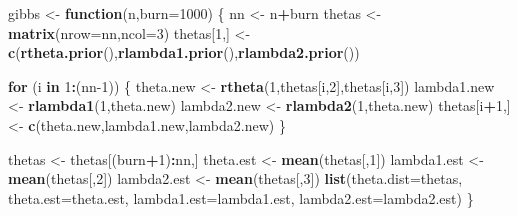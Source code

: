 \documentclass[
  11pt,
]{article}
\newenvironment{Shaded}{\begin{snugshade}}{\end{snugshade}}
\newcommand{\AttributeTok}[1]{\textcolor[rgb]{0.13,0.29,0.53}{#1}}
\newcommand{\ControlFlowTok}[1]{\textcolor[rgb]{0.13,0.29,0.53}{\textbf{#1}}}
\newcommand{\DecValTok}[1]{\textcolor[rgb]{0.00,0.00,0.81}{#1}}
\newcommand{\FunctionTok}[1]{\textcolor[rgb]{0.13,0.29,0.53}{\textbf{#1}}}
\newcommand{\NormalTok}[1]{#1}
\newcommand{\OtherTok}[1]{\textcolor[rgb]{0.56,0.35,0.01}{#1}}
\newcommand{\SpecialCharTok}[1]{\textcolor[rgb]{0.81,0.36,0.00}{\textbf{#1}}}
\begin{document}
\begin{Shaded}
\begin{Highlighting}[]
\NormalTok{gibbs }\OtherTok{\textless{}{-}} \ControlFlowTok{function}\NormalTok{(n,}\AttributeTok{burn=}\DecValTok{1000}\NormalTok{)}
\NormalTok{\{}
\NormalTok{  nn }\OtherTok{\textless{}{-}}\NormalTok{ n}\SpecialCharTok{+}\NormalTok{burn}
\NormalTok{  thetas }\OtherTok{\textless{}{-}} \FunctionTok{matrix}\NormalTok{(}\AttributeTok{nrow=}\NormalTok{nn,}\AttributeTok{ncol=}\DecValTok{3}\NormalTok{)}
\NormalTok{  thetas[}\DecValTok{1}\NormalTok{,] }\OtherTok{\textless{}{-}} \FunctionTok{c}\NormalTok{(}\FunctionTok{rtheta.prior}\NormalTok{(),}\FunctionTok{rlambda1.prior}\NormalTok{(),}\FunctionTok{rlambda2.prior}\NormalTok{())}
  
  \ControlFlowTok{for}\NormalTok{ (i }\ControlFlowTok{in} \DecValTok{1}\SpecialCharTok{:}\NormalTok{(nn}\DecValTok{{-}1}\NormalTok{))}
\NormalTok{  \{}
\NormalTok{    theta.new }\OtherTok{\textless{}{-}} \FunctionTok{rtheta}\NormalTok{(}\DecValTok{1}\NormalTok{,thetas[i,}\DecValTok{2}\NormalTok{],thetas[i,}\DecValTok{3}\NormalTok{])}
\NormalTok{    lambda1.new }\OtherTok{\textless{}{-}} \FunctionTok{rlambda1}\NormalTok{(}\DecValTok{1}\NormalTok{,theta.new)}
\NormalTok{    lambda2.new }\OtherTok{\textless{}{-}} \FunctionTok{rlambda2}\NormalTok{(}\DecValTok{1}\NormalTok{,theta.new)}
\NormalTok{    thetas[i}\SpecialCharTok{+}\DecValTok{1}\NormalTok{,] }\OtherTok{\textless{}{-}} \FunctionTok{c}\NormalTok{(theta.new,lambda1.new,lambda2.new)}
\NormalTok{  \}}

\NormalTok{  thetas }\OtherTok{\textless{}{-}}\NormalTok{ thetas[(burn}\SpecialCharTok{+}\DecValTok{1}\NormalTok{)}\SpecialCharTok{:}\NormalTok{nn,]}
\NormalTok{  theta.est }\OtherTok{\textless{}{-}} \FunctionTok{mean}\NormalTok{(thetas[,}\DecValTok{1}\NormalTok{])}
\NormalTok{  lambda1.est }\OtherTok{\textless{}{-}} \FunctionTok{mean}\NormalTok{(thetas[,}\DecValTok{2}\NormalTok{])}
\NormalTok{  lambda2.est }\OtherTok{\textless{}{-}} \FunctionTok{mean}\NormalTok{(thetas[,}\DecValTok{3}\NormalTok{])}
  \FunctionTok{list}\NormalTok{(}\AttributeTok{theta.dist=}\NormalTok{thetas,}
       \AttributeTok{theta.est=}\NormalTok{theta.est,}
       \AttributeTok{lambda1.est=}\NormalTok{lambda1.est,}
       \AttributeTok{lambda2.est=}\NormalTok{lambda2.est)}
\NormalTok{\}}
\end{Highlighting}
\end{Shaded}
\end{document}
